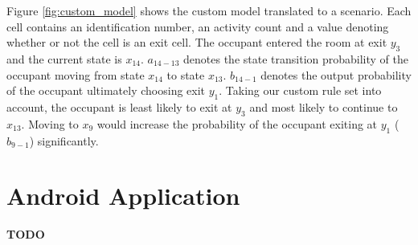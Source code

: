 Figure \ref{fig:custom_model} shows the custom model translated to a scenario. Each cell contains an identification number, an activity count and a value denoting whether or not the cell is an exit cell. The occupant entered the room at exit \(y_3\) and the current state is \(x_{14}\). \(a_{14-13}\) denotes the state transition probability of the occupant moving from state \(x_{14}\) to state \(x_{13}\). \(b_{14-1}\) denotes the output probability of the occupant ultimately choosing exit \(y_{1}\). Taking our custom rule set into account, the occupant is least likely to exit at \(y_3\) and most likely to continue to \(x_{13}\). Moving to \(x_9\) would increase the probability of the occupant exiting at \(y_{1}\) (\(b_{9-1}\)) significantly.

\section{Android Application}
{\color[rgb]{1,0,0} \textbf{\large TODO}}